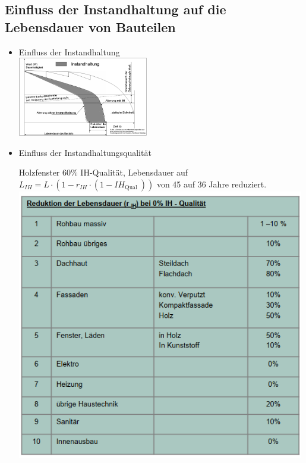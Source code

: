 \documentclass[fleqn,twoside,dvipsnames]{article}
\begin{document}
    \subsection{Einfluss der Instandhaltung auf die Lebensdauer von Bauteilen}
        \begin{itemize}
            \item Einfluss der Instandhaltung\\
                \includegraphics[width=0.45\textwidth]{Grafiken/Lebensdauer und Abnutzung von Bauteilen/Einfluss Instandhaltung.png}
            \item Einfluss der Instandhaltungsqualität\\
                    \begin{minipage}{0.4\textwidth}
                        Holzfenster $60 \%$ IH-Qualität, Lebensdauer auf $ L_{I H}=L \cdot\left(1-r_{I H} \cdot\left(1-IH_{\text {Qual }}\right)\right) $ von 45 auf 36 Jahre reduziert.\\
                        \includegraphics[width=0.99\textwidth]{Grafiken/Lebensdauer und Abnutzung von Bauteilen/Einfluss IH Qualitaet.png}

\end{minipage}
\end{itemize}
\end{document}
